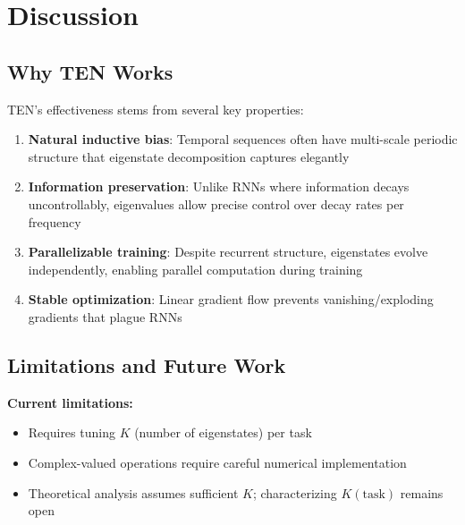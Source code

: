 \documentclass[11pt,letterpaper]{article}
\begin{document}
\section{Discussion}

\subsection{Why TEN Works}

TEN's effectiveness stems from several key properties:

\begin{enumerate}
    \item \textbf{Natural inductive bias}: Temporal sequences often have multi-scale periodic structure that eigenstate decomposition captures elegantly
    
    \item \textbf{Information preservation}: Unlike RNNs where information decays uncontrollably, eigenvalues allow precise control over decay rates per frequency
    
    \item \textbf{Parallelizable training}: Despite recurrent structure, eigenstates evolve independently, enabling parallel computation during training
    
    \item \textbf{Stable optimization}: Linear gradient flow prevents vanishing/exploding gradients that plague RNNs
\end{enumerate}

\subsection{Limitations and Future Work}

\textbf{Current limitations:}
\begin{itemize}
    \item Requires tuning $K$ (number of eigenstates) per task
    \item Complex-valued operations require careful numerical implementation
    \item Theoretical analysis assumes sufficient $K$; characterizing $K(\text{task})$ remains open
\end{itemize}
\end{document}
